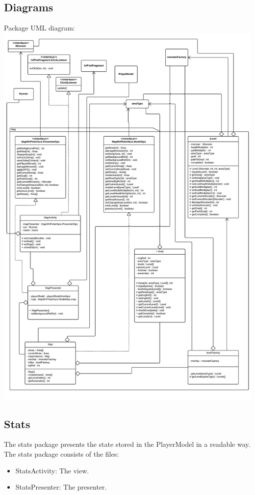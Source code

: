 \documentclass{article}
\begin{document}
\subsection{Diagrams}
    Package UML diagram:\\
    \includegraphics[scale=0.2]{uml/mapUml.png}

\subsection{Stats}
The stats package presents the state stored in the PlayerModel in a readable way.\\
The stats package consists of the files:
\begin{itemize}
    \item StatsActivity: The view.
    \item StatsPresenter: The presenter.
\end{itemize}
\end{document}
